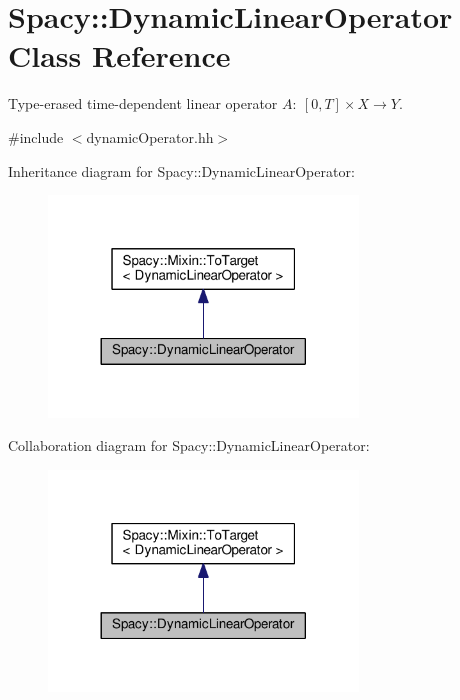 \hypertarget{classSpacy_1_1DynamicLinearOperator}{}\section{Spacy\+:\+:Dynamic\+Linear\+Operator Class Reference}
\label{classSpacy_1_1DynamicLinearOperator}


Type-\/erased time-\/dependent linear operator $A:\ [0,T] \times X \to Y $.  




{\ttfamily \#include $<$dynamic\+Operator.\+hh$>$}



Inheritance diagram for Spacy\+:\+:Dynamic\+Linear\+Operator\+:\nopagebreak
\begin{figure}[H]
\begin{center}
\leavevmode
\includegraphics[width=233pt]{classSpacy_1_1DynamicLinearOperator__inherit__graph}
\end{center}
\end{figure}


Collaboration diagram for Spacy\+:\+:Dynamic\+Linear\+Operator\+:\nopagebreak
\begin{figure}[H]
\begin{center}
\leavevmode
\includegraphics[width=233pt]{classSpacy_1_1DynamicLinearOperator__coll__graph}
\end{center}
\end{figure}
